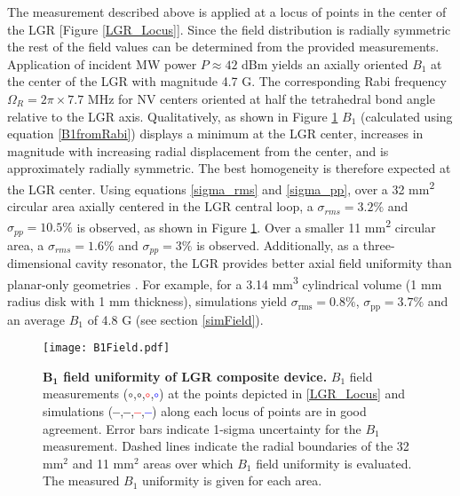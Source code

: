 The measurement described above is applied at a locus of points in the center of the LGR [Figure \ref{LGR_Locus}]. Since the field distribution is radially symmetric the rest of the field values can be determined from the provided measurements. Application of incident MW power $P \approx 42$ dBm yields an axially oriented $B_1$ at the center of the LGR with magnitude 4.7 G. The corresponding Rabi frequency $\Omega_R = 2\pi \times 7.7$ MHz for NV centers oriented at half the tetrahedral bond angle relative to the LGR axis. Qualitatively, as shown in Figure \ref{LGR_Field_Image} $B_1$ (calculated using equation \ref{B1fromRabi}) displays a minimum at the LGR center, increases in magnitude with increasing radial displacement from the center, and is approximately radially symmetric. The best homogeneity is therefore expected at the LGR center. Using equations \ref{sigma_rms} and \ref{sigma_pp}, over a 32 mm\textsuperscript{2} circular area axially centered in the LGR
central loop, a $\sigma_{rms} = 3.2\%$ and $\sigma_{pp} = 10.5\%$ is observed, as shown in Figure \ref{LGR_Field_Image}. Over a smaller 11 mm\textsuperscript{2} circular area, a $\sigma_{rms} = 1.6\%$ and $\sigma_{pp} = 3\%$ is observed. Additionally, as a three-dimensional cavity resonator, the LGR provides better axial field uniformity than planar-only geometries \cite{floch2016towards,kapitanova2017dielectric,angerer2016collective}. For example, for a 3.14 mm\textsuperscript{3} cylindrical volume (1 mm radius disk with 1 mm thickness), simulations yield $\sigma_{\text{rms}}=0.8\%$, $\sigma_{\text{pp}}=3.7\%$ and an average $B_1$ of 4.8 G (see section \ref{simField}).


\begin{figure}[t!]
\centering
\texttt{[image: B1Field.pdf]}  
\caption{\textbf{$\boldsymbol{B_1}$ field uniformity of LGR composite device.} $B_1$ field measurements (\textcolor{deepmagenta}{$\circ$},\textcolor{black}{$\circ$},\textcolor{red}{$\circ$},\textcolor{blue}{$\circ$}) at the points depicted in \ref{LGR_Locus} and simulations (\textcolor{deepmagenta}{\textbf{--}},\textcolor{black}{\textbf{--}},\textcolor{red}{\textbf{--}},\textcolor{blue}{\textbf{--}}) along each locus of points are in good agreement. Error bars indicate 1-sigma uncertainty for the $B_1$ measurement. Dashed lines indicate the radial boundaries of the 32 mm$^2$ and 11 mm$^2$ areas over which $B_1$ field uniformity is evaluated. The measured $B_1$ uniformity is given for each area.}
\label{LGR_Field_Image}
\end{figure}



